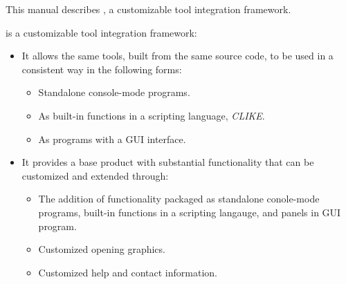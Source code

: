 This manual describes \emph{\productname{}}, a customizable tool integration
framework.

\emph{\productname{}} is a customizable tool integration framework:
\begin{itemize}
      \item It allows the same tools, built from the same source code,
            to be used in a consistent way in the following forms:
            \begin{itemize}
                  \item Standalone console-mode programs.
                  \item As built-in functions in a scripting language, \emph{CLIKE}.
                  \item As programs with a GUI interface.
            \end{itemize}
      \item It provides a base product with substantial functionality that can be
            customized and extended through:
            \begin{itemize}
                \item The addition of functionality packaged as standalone conole-mode programs,
                      built-in functions in a scripting langauge, and panels in GUI
                      program.
                \item Customized opening graphics.
                \item Customized help and contact information.
          \end{itemize}
\end{itemize}

%
%
%
%
%
%
%
%
%
%
%
%
%
%
%
%
%
%
%
%
%
%
%
%
%
%
%
%
%
%
%
%
%
%
%
%
%
%
%
%
%
